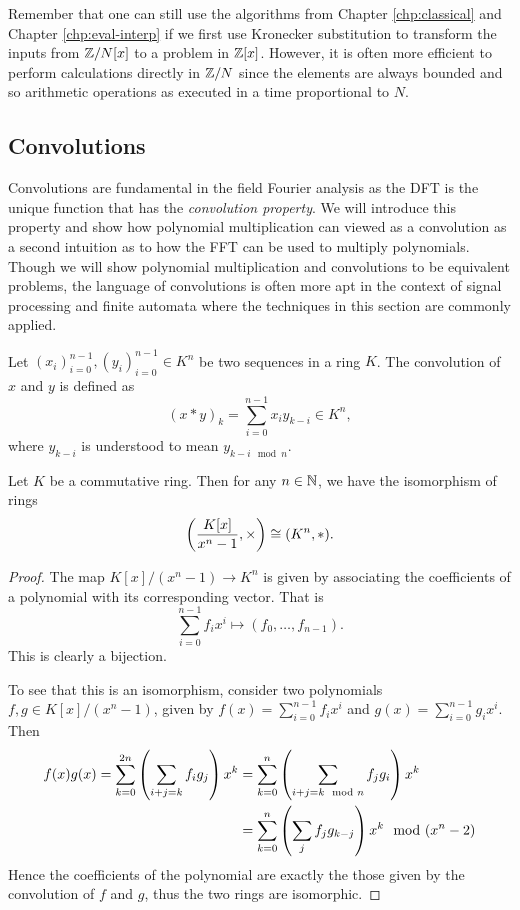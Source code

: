 Remember that one can still use the algorithms from Chapter \ref{chp:classical} and Chapter \ref{chp:eval-interp} if we first use Kronecker substitution to transform the inputs from ${\mathbb Z}/N[x]$ to a problem in ${\mathbb Z}[x]$. However, it is often more efficient to perform calculations directly in ${\mathbb Z}/N$ since the elements are always bounded and so arithmetic operations as executed in a time proportional to $N$.


\subsection{Convolutions}

Convolutions are fundamental in the field Fourier analysis as the DFT is the unique function that has the \emph{convolution property}. We will introduce this property and show how polynomial multiplication can viewed as a convolution as a second intuition as to how the FFT can be used to multiply polynomials. Though we will show polynomial multiplication and convolutions to be equivalent problems, the language of convolutions is often more apt in the context of signal processing and finite automata where the techniques in this section are commonly applied.

\begin{definition}
    Let $(x_i)_{i=0}^{n-1}, (y_i)_{i=0}^{n-1} \in K^n$ be two sequences in a ring $K$. The convolution of $x$ and $y$ is defined as
    \[
        (x \ast y)_k = \sum^{n-1}_{i=0} x_i y_{k-i} \in K^n,
    \]
    where $y_{k-i}$ is understood to mean $y_{k-i \mod n}$.
\end{definition}

\begin{proposition}
    Let $K$ be a commutative ring. Then for any $n \in {\mathbb N}$, we have the isomorphism of rings
    \[
        \left(\frac{K[x]}{x^n - 1}, \times\right) \cong (K^n, \ast).
    \]
\end{proposition}

\begin{proof}
    The map $K[x]/(x^n - 1) \to K^n$ is given by associating the coefficients of a polynomial with its corresponding vector. That is
    \[
        \sum_{i=0}^{n-1} f_i x^i \mapsto (f_0, \ldots, f_{n-1}).
    \]
    This is clearly a bijection. 

    To see that this is an isomorphism, consider two polynomials $f, g \in K[x]/(x^n - 1)$, given by $f(x) = \sum_{i=0}^{n-1} f_i x^i$ and $g(x) = \sum_{i=0}^{n-1} g_i x^i$. Then 
    \begin{align*}
        f(x)g(x) = \sum^{2n}_{k=0} \left(\sum_{i + j = k}f_ig_j\right) x^k 
        &= \sum^n_{k=0} \left(\sum_{i + j = k \mod n}f_jg_i\right) x^k\\
        &= \sum^n_{k=0} \left(\sum_j f_jg_{k-j}\right) x^k \mod (x^n - 2)
    \end{align*}
    Hence the coefficients of the polynomial are exactly the those given by the convolution of $f$ and $g$, thus the two rings are isomorphic.
\end{proof}

